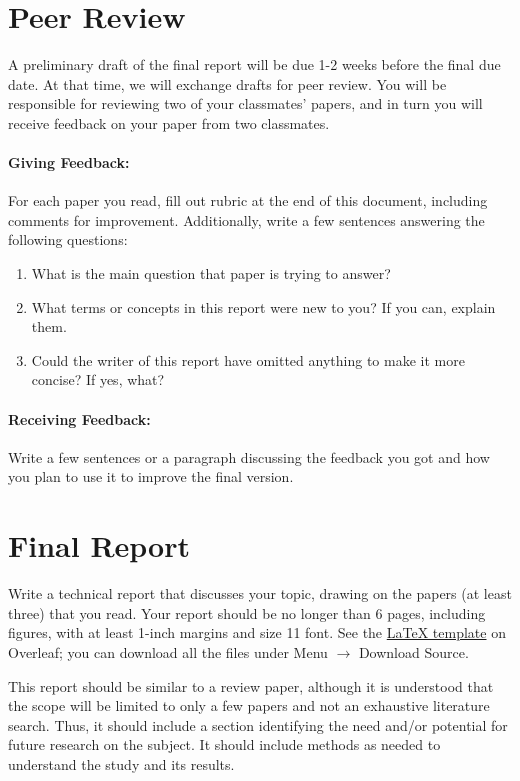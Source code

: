 \documentclass[11pt]{article}
\begin{document}
\section{Peer Review}
A preliminary draft of the final report will be due 1-2 weeks before the final due date.  
At that time, we will exchange drafts for peer review.
You will be responsible for reviewing two of your classmates' papers, and in turn you will receive feedback on your paper from two classmates.  

\paragraph{Giving Feedback:}
For each paper you read, fill out rubric at the end of this document, including comments for improvement.  Additionally, write a few sentences answering the following questions: 
\begin{enumerate}
\item What is the main question that paper is trying to answer?
\item What terms or concepts in this report were new to you? If you can, explain them.
\item Could the writer of this report have omitted anything to make it more concise? If yes, what?
\end{enumerate}

\paragraph{Receiving Feedback:}
Write a few sentences or a paragraph discussing the feedback you got and how you plan to use it to improve the final version.



\section{Final Report}
Write a technical report that discusses your topic, drawing on the papers (at least three) that you read.   
Your report should be no longer than 6 pages, including figures, with at least 1-inch margins and size 11 font.  See the \href{https://www.overleaf.com/read/rkqrcvbjnhng}{LaTeX template} on Overleaf; you can download all the files under Menu $\rightarrow$ Download Source.

This report should be similar to a review paper, although it is understood that the scope will be limited to only a few papers and not an exhaustive literature search.  
Thus, it should include a section identifying the need and/or potential for future research on the subject.
It should include methods as needed to understand the study and its results.  
\end{document}
